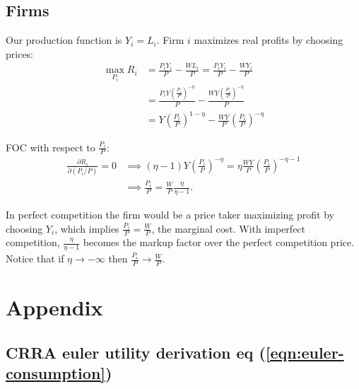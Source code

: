 \documentclass[../main.tex]{subfiles}
\begin{document}
    \subsection{Firms}
    
        Our production function is $Y_i = L_i$. Firm $i$ maximizes real profits by choosing prices:
        \begin{align}
            \max_{P_i} R_i &= \frac{P_i Y_i}{P} - \frac{W L_i}{P}
            = \frac{P_i Y_i}{P} - \frac{W Y_i}{P}
            \\
            &= \frac{P_i Y \left(\frac{P_i}{P}\right)^{-\eta}}{P} - \frac{W Y \left(\frac{P_i}{P}\right)^{-\eta}}{P}
            \\
            &= Y \left(\frac{{P_i}}{P}\right)^{1-\eta} - \frac{WY}{P} \left(\frac{{P_i}}{P}\right)^{-\eta}
        \end{align}
        
        FOC with respect to $\frac{P_i}{P}$:
        \begin{align}
            \frac{\partial R_i}{\partial (P_i / P)} = 0
            &\implies 
            (\eta-1) Y \left(\frac{{P_i}}{P}\right)^{-\eta} 
            = \eta \frac{WY}{P} \left(\frac{{P_i}}{P}\right)^{-\eta-1}
            \\
            &\implies
            \frac{P_i}{P} = \frac{W}{P} \frac{\eta}{\eta-1}.
            \label{eqn:markup-price}
        \end{align}
        
        In perfect competition the firm would be a price taker maximizing profit by choosing $Y_i$, which implies $\frac{P_i}{P} = \frac{W}{P}$, the marginal cost. With imperfect competition, $\frac{\eta}{\eta - 1}$ becomes the markup factor over the perfect competition price. Notice that if $\eta \to -\infty$ then $\frac{P_i}{P} \to \frac{W}{P}$.
        
    
    \renewcommand{\thesection}{A\arabic{chapter}}
    
    \newpage
    \section{Appendix}
    
    \subsection{CRRA euler utility derivation eq (\ref{eqn:euler-consumption})}\label{calc:euler-consumption}
        
\end{document}
